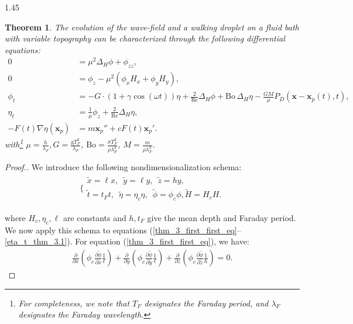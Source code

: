 \documentclass[12pt,titlepage]{article}
\newtheorem{theorem}{Theorem}[section] %
\theoremstyle{definition}
\theoremstyle{remark}
\newcommand{\ptl}{\partial}
\newcommand{\til}[1]{\widetilde{#1}}
\newcommand{\M}[1]{\mathbf{#1}}
\begin{document}
\begin{spacing}{1.45}
\begin{theorem}
\label{nondim_procedure}
The evolution of the wave-field and a walking droplet on a fluid bath with variable topography can be characterized through the following differential equations:
\begin{align}
    \label{laplacian_1}
    0 &= \mu^2 \Delta_{{H}}{{\phi}} + \phi_{zz}, \\
\label{bottom_1}
    0 &= \phi_z - \mu^2({{\phi}_{{x}} {H}_{{x}} + {\phi}_{{y}} {H}_{{y}}}),\\
\label{weird_1}
    \phi_t &= - G \cdot  (1 + \gamma \cos(\omega t)) {\eta} + \frac{2}{\mathrm{Re}}  \Delta_{{H}}{{\phi}} + \mathrm{Bo} \, \Delta_{{H}}{{\eta}} - \frac{GM}{\rho} P_D({\M{{x}}} - {\M{{x}}_p(t)}, t), \\
\label{kinematical_condition_1}
    {\eta}_{{t}} &=  \frac{1} {\mu} {\phi}_{{z}} +\frac{2}{\mathrm{Re}} \Delta_H{{\eta}}, \\
\label{position_update}
    - F(t) \nabla \eta (\M{x}_p) &=  m \M{x}_p'' + c F(t) \M{x}_p'.
\end{align}
with\footnote{For completeness, we note that $T_F$ designates the Faraday period, and $\lambda_F$ designates the Faraday wavelength.} $\mu = \frac{h}{\lambda_F}, G = \frac{\text{g} T_F^2}{\lambda_F}$, $\mathrm{Bo} = \frac{\sigma T_F^2}{\rho \lambda_F^3}$, $M = \frac{m}{\rho \lambda_F^3}$.
\end{theorem}

\begin{proof}[Proof.] We introduce the following nondimensionalization schema:
\begin{align*}
    \Bigg \{
    \begin{array}{ll}
      \til{x} = \ell x, \, \, \, \til{y} = \ell y, \, \, \, \til{z} = hy, \, \, \, \\
    \til{t} = t_F t, \, \, \, \til{\eta} = \eta_c \eta, \, \, \, \til{\phi} = \phi_c \phi,\til{H} = H_c H. 
    \end{array}
\end{align*}
 
where $H_c, \eta_c, \ell$ are constants and $h, t_F$ give the mean depth and Faraday period. We now apply this schema to equations (\ref{thm_3_first_first_eq}–\ref{eta_t_thm_3.1}). For equation (\ref{thm_3_first_first_eq}), we have:
\begin{align*}
    \frac{\ptl}{\ptl x} \left(\phi_c \frac{\ptl \til{\phi}}{\ptl \til{x}} \frac{1}{\ell} \right) + \frac{\ptl}{\ptl y} \left(\phi_c \frac{\ptl \til{\phi}}{\ptl \til{y}} \frac{1}{\ell} \right) + \frac{\ptl}{\ptl z} \left(\phi_c \frac{\ptl \til{\phi}}{\ptl \til{z}} \frac{1}{h} \right) = 0.
\end{align*}


\end{proof}
\end{spacing}
\end{document}
